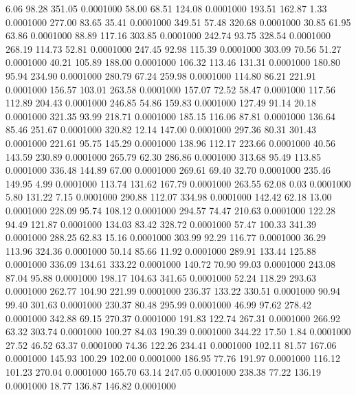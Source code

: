    6.06   98.28  351.05   0.0001000
  58.00   68.51  124.08   0.0001000
 193.51  162.87    1.33   0.0001000
 277.00   83.65   35.41   0.0001000
 349.51   57.48  320.68   0.0001000
  30.85   61.95   63.86   0.0001000
  88.89  117.16  303.85   0.0001000
 242.74   93.75  328.54   0.0001000
 268.19  114.73   52.81   0.0001000
 247.45   92.98  115.39   0.0001000
 303.09   70.56   51.27   0.0001000
  40.21  105.89  188.00   0.0001000
 106.32  113.46  131.31   0.0001000
 180.80   95.94  234.90   0.0001000
 280.79   67.24  259.98   0.0001000
 114.80   86.21  221.91   0.0001000
 156.57  103.01  263.58   0.0001000
 157.07   72.52   58.47   0.0001000
 117.56  112.89  204.43   0.0001000
 246.85   54.86  159.83   0.0001000
 127.49   91.14   20.18   0.0001000
 321.35   93.99  218.71   0.0001000
 185.15  116.06   87.81   0.0001000
 136.64   85.46  251.67   0.0001000
 320.82   12.14  147.00   0.0001000
 297.36   80.31  301.43   0.0001000
 221.61   95.75  145.29   0.0001000
 138.96  112.17  223.66   0.0001000
  40.56  143.59  230.89   0.0001000
 265.79   62.30  286.86   0.0001000
 313.68   95.49  113.85   0.0001000
 336.48  144.89   67.00   0.0001000
 269.61   69.40   32.70   0.0001000
 235.46  149.95    4.99   0.0001000
 113.74  131.62  167.79   0.0001000
 263.55   62.08    0.03   0.0001000
   5.80  131.22    7.15   0.0001000
 290.88  112.07  334.98   0.0001000
 142.42   62.18   13.00   0.0001000
 228.09   95.74  108.12   0.0001000
 294.57   74.47  210.63   0.0001000
 122.28   94.49  121.87   0.0001000
 134.03   83.42  328.72   0.0001000
  57.47  100.33  341.39   0.0001000
 288.25   62.83   15.16   0.0001000
 303.99   92.29  116.77   0.0001000
  36.29  113.96  324.36   0.0001000
  50.14   85.66   11.92   0.0001000
 289.91  133.44  125.88   0.0001000
 336.09  134.61  333.22   0.0001000
 140.72   70.90   99.03   0.0001000
 243.08   87.04   95.88   0.0001000
 198.17  104.63  341.65   0.0001000
  52.24  118.29  293.63   0.0001000
 262.77  104.90  221.99   0.0001000
 236.37  133.22  330.51   0.0001000
  90.94   99.40  301.63   0.0001000
 230.37   80.48  295.99   0.0001000
  46.99   97.62  278.42   0.0001000
 342.88   69.15  270.37   0.0001000
 191.83  122.74  267.31   0.0001000
 266.92   63.32  303.74   0.0001000
 100.27   84.03  190.39   0.0001000
 344.22   17.50    1.84   0.0001000
  27.52   46.52   63.37   0.0001000
  74.36  122.26  234.41   0.0001000
 102.11   81.57  167.06   0.0001000
 145.93  100.29  102.00   0.0001000
 186.95   77.76  191.97   0.0001000
 116.12  101.23  270.04   0.0001000
 165.70   63.14  247.05   0.0001000
 238.38   77.22  136.19   0.0001000
  18.77  136.87  146.82   0.0001000
